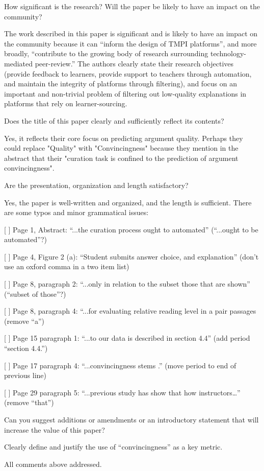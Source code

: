 \documentclass[notitlepage,12pt]{article}
\newcounter{answ}
\begin{document}
    \begin{revcomment}{How significant is the research? Will the paper be likely to have an impact on the community?}

    The work described in this paper is significant and is likely to have an impact on the community because it can “inform the design of TMPI platforms”, and more broadly, “contribute to the growing body of research surrounding technology-mediated peer-review.” The authors clearly state their research objectives (provide feedback to learners, provide support to teachers through automation, and maintain the integrity of platforms through filtering), and focus on an important and non-trivial problem of filtering out low-quality explanations in platforms that rely on learner-sourcing.
    \end{revcomment}

    \begin{revcomment}{Does the title of this paper clearly and sufficiently reflect its contents?}


    Yes, it reflects their core focus on predicting argument quality. Perhaps they could replace "Quality" with "Convincingness" because they mention in the abstract that their "curation task is confined to the prediction of argument convincingness".
    \end{revcomment}

    \begin{revcomment}{Are the presentation, organization and length satisfactory?}


    Yes, the paper is well-written and organized, and the length is sufficient. There are some typos and minor grammatical issues:

    [ ] Page 1, Abstract: “...the curation process ought to automated” (“...ought to be automated”?)

    [ ] Page 4, Figure 2 (a): “Student submits answer choice, and explanation” (don’t use an oxford comma in a two item list)

    [ ] Page 8, paragraph 2: “...only in relation to the subset those that are shown” (“subset of those”?)

    [ ] Page 8, paragraph 4: “...for evaluating relative reading level in a pair passages (remove “a”)

    [ ] Page 15 paragraph 1: “...to our data is described in section 4.4” (add period “section 4.4.”)

    [ ] Page 17 paragraph 4: “...convincingness stems .” (move period to end of previous line)

    [ ] Page 29 paragraph 5: “...previous study has show that how instructors…” (remove “that”)

Can you suggest additions or amendments or an introductory statement that will increase the value of this paper?

Clearly define and justify the use of “convincingness” as a key metric.

\begin{authors}
  All comments above addressed.
\end{authors}

    \end{revcomment}
\end{document}
